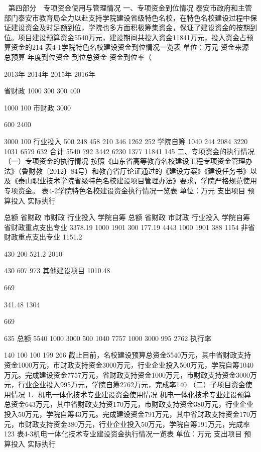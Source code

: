 
第四部分　专项资金使用与管理情况
一、专项资金到位情况
泰安市政府和主管部门泰安市教育局全力以赴支持学院建设省级特色名校，在特色名校建设过程中保证建设资金及时足额到位，学院也多方面积极筹集资金，保证了建设资金的按期到位。项目建设预算资金5540万元，建设期间共投入资金11841万元，投入资金占预算资金的214 %
表4-1学院特色名校建设资金到位情况一览表
                                                 单位：万元
资金来源
总预算
年度到位资金
到位总资金
资金到位率（%


2013年
2014年
2015年
2016年


省财政
1000
300
300
400

1000
100
市财政
3000

600
2400

3000
100
行业投入
500
248
458
210
346
1262
252
学院自筹
1040
244
2084
3220
1031
6579
632
合计
5540
792
3442
6230
1377
11841
145
二、专项资金的执行情况
（一）专项资金的执行情况
按照《山东省高等教育名校建设工程专项资金管理办法》（鲁财教〔2012〕84号）和教育省厅论证通过的《建设方案》《建设任务书》以及《泰山职业技术学院省级特色名校建设项目管理办法》要求，学院严格规范使用专项资金。
表4-2学院特色名校建设资金执行情况一览表
                                                     单位：万元
支出项目
预算投入
实际执行

总额
省财政
市财政
行业投入
学院自筹
总额
省财政
市财政
行业投入
学院自筹
省财政重点支出专业
3378.19
1000
1901
300
177.19
4443
1000
1901
388
1154
非省财政重点支出专业
1151.2

430
200
521.2
2010

430
607
973
其他建设项目
1010.48

669

341.48
1304

669

635
总额
5540
1000
3000
500
1040
7757
1000
3000
995
2762
执行率%

140
100
100
199
266
截止目前，名校建设预算总资金5540万元，其中省财政支持资金1000万元，市财政支持资金3000万元，行业企业投入500万元，学院自筹1040万元。完成建设资金7757万元，省财政支持资金1000万元，市财政支持资金3000万元，行业企业投入995万元，学院自筹2762万元，完成率140%
（二）子项目资金使用情况
1．机电一体化技术专业建设资金使用情况
机电一体化技术专业建设预算总资金643万元，其中省财政支持资170万元，市财政支持资金380万元，行业企业投入50万元，学院自筹43万元。完成建设资金791万元，其中省财政支持资金170万元，市财政支持资金380万元，行业企业投入50万元，学院自筹191万元，完成率123%
表4-3机电一体化技术专业建设资金执行情况一览表
单位：万元
支出项目
预算投入
实际执行

